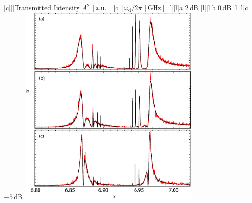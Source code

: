

\figstyle
 [c][]{Transmitted Intensity $A^2\,[\text{a.u.}]$}
 [c][]{$\omega_\text{d}/2\pi\, [\text{GHz}]$}
 [l][l]{{\panelstyle a } $2$\,dB}
 [l][l]{{\panelstyle b } $0$\,dB}
 [l][l]{{\panelstyle c } $-5$\,dB}
 \includegraphics[height=4in]{nodissip.eps}

